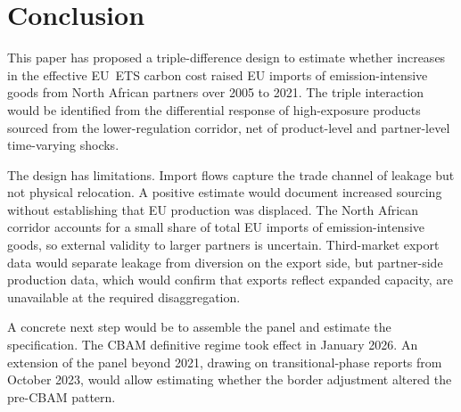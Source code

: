 \section{Conclusion}
\label{sec:conclusion}

This paper has proposed a triple-difference design to estimate whether increases in the effective EU~ETS carbon cost raised EU imports of emission-intensive goods from North African partners over 2005 to 2021. The triple interaction would be identified from the differential response of high-exposure products sourced from the lower-regulation corridor, net of product-level and partner-level time-varying shocks.

The design has limitations. Import flows capture the trade channel of leakage but not physical relocation. A positive estimate would document increased sourcing without establishing that EU production was displaced. The North African corridor accounts for a small share of total EU imports of emission-intensive goods, so external validity to larger partners is uncertain. Third-market export data would separate leakage from diversion on the export side, but partner-side production data, which would confirm that exports reflect expanded capacity, are unavailable at the required disaggregation.

A concrete next step would be to assemble the panel and estimate the specification. The CBAM definitive regime took effect in January 2026. An extension of the panel beyond 2021, drawing on transitional-phase reports from October 2023, would allow estimating whether the border adjustment altered the pre-CBAM pattern.
